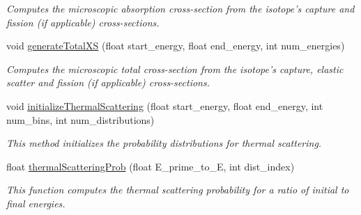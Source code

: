 \begin{DoxyCompactItemize}
\begin{DoxyCompactList}\small\item\em Computes the microscopic absorption cross-\/section from the isotope's capture and fission (if applicable) cross-\/sections. \end{DoxyCompactList}\item 
void \hyperlink{classIsotope_a5b68d64fbb0f9692d068a63e2e047910}{generate\-Total\-X\-S} (float start\-\_\-energy, float end\-\_\-energy, int num\-\_\-energies)
\begin{DoxyCompactList}\small\item\em Computes the microscopic total cross-\/section from the isotope's capture, elastic scatter and fission (if applicable) cross-\/sections. \end{DoxyCompactList}\item 
void \hyperlink{classIsotope_ad0a509a4dcab1c06afac3d9c9a3dfda8}{initialize\-Thermal\-Scattering} (float start\-\_\-energy, float end\-\_\-energy, int num\-\_\-bins, int num\-\_\-distributions)
\begin{DoxyCompactList}\small\item\em This method initializes the probability distributions for thermal scattering. \end{DoxyCompactList}\item 
float \hyperlink{classIsotope_a9d238e8892a667f058dd68af42af7fdc}{thermal\-Scattering\-Prob} (float E\-\_\-prime\-\_\-to\-\_\-\-E, int dist\-\_\-index)
\begin{DoxyCompactList}\small\item\em This function computes the thermal scattering probability for a ratio of initial to final energies. \end{DoxyCompactList}\end{DoxyCompactItemize}
